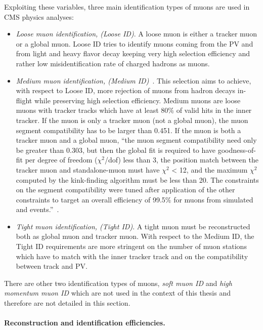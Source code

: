 Exploiting these variables, three main identification types of muons
are used in CMS physics analyses:
\begin{itemize}
\setlength\itemsep{-0.2em}
\item \emph{Loose muon identification, (Loose ID)}. A loose muon is either a
  tracker muon or a global muon. Loose ID tries to identify muons
  coming from the PV and from light and heavy flavor decay keeping
  very high selection efficiency and rather low misidentification rate
  of charged hadrons as muons. 
\item \emph{Medium muon identification, (Medium
    ID)}~\cite{PetruccianiBotta}. This selection aims to achieve, with
  respect to Loose ID, more rejection	
of muons from hadron decays in-flight while preserving
high selection efficiency. Medium muons are loose muons with tracker
tracks which have at least 80\% of valid hits in the inner tracker. 
If the muon is only a tracker muon (not a global muon), the muon
segment compatibility has to be larger than
0.451. If the muon is both a tracker muon and a global muon, ``the
muon segment compatibility need only be greater than 0.303, but then the global fit
is required to have goodness-of-fit per degree of freedom ($\chi^2$/dof) less than 3, the
position match between the tracker muon and standalone-muon must have $\chi^2$ < 12,
and the maximum $\chi^2$ computed by the kink-finding algorithm must be less than 20.
The constraints on the segment compatibility were tuned after application of the
other constraints to target an overall efficiency of 99.5\% for muons from simulated
\PW and \PZ events.''~\cite{Sirunyan_2018_muon}.
\item \emph{Tight muon identification, (Tight ID)}. A tight muon must
  be reconstructed both as global muon and tracker muon. With respect
  to the Medium ID, the Tight ID requirements are more stringent on
  the number of muon stations which have to match with the inner
  tracker track and on the compatibility between track and PV. 
\end{itemize}
There are other two identification types of muons, \emph{soft muon ID}
and \emph{high momentum muon ID} which are not used in the context of
this thesis and therefore are not detailed in this section. 


\paragraph{Reconstruction and identification
  efficiencies.}\label{sec:c2effmuon}

